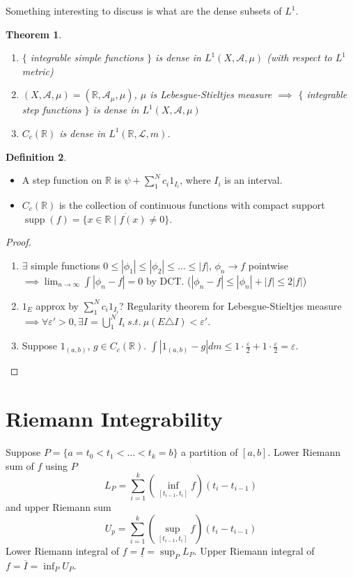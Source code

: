 \documentclass{report}
\newcommand{\R}{\mathbb{R}}
\newcommand{\st}{\ s.t.\ }
\newcommand{\cA}{\mathcal{A}}
\def \supp {\operatorname{supp}}
\newtheorem{theorem}{Theorem}[chapter]
\theoremstyle{definition}
\newtheorem{definition}[theorem]{Definition}
\theoremstyle{remark}
\newcommand{\fnl}{\parbox[t]{0\linewidth}{}}
\begin{document}
Something interesting to discuss is what are the dense subsets of $L^1$.
\begin{theorem}\fnl
	\begin{enumerate}
		\item $\{$ integrable simple functions $\}$ is dense in $L^1(X, \cA, \mu)$ (with respect to $L^1$ metric)
		\item $(X, \cA, \mu) = (\R, \cA_\mu, \mu)$, $\mu$ is Lebesgue-Stieltjes measure $\implies$ $\{$ integrable step functions $\}$ is dense in $L^1(X, \cA, \mu)$ 
		\item $C_c(\R)$ is dense in $L^1(\R, \mathcal{L}, m)$.
	\end{enumerate}
\end{theorem}
\begin{definition}\fnl
	\begin{itemize}
		\item A step function on $\R$ is $\psi + \sum_1^N c_i 1_{I_i}$, where $I_i$ is an interval.
		\item $C_c(\R)$ is the collection of continuous functions with compact support $\supp(f) = \overline{\{x \in \R \mid f(x) \neq 0\}}$.
	\end{itemize}
\end{definition}
\begin{proof}
	\begin{enumerate}
		\item $\exists$ simple functions $0 \leq |\phi_1| \leq |\phi_2| \leq \ldots \leq |f|$, $\phi_n \to f$ pointwise $\implies \displaystyle \lim_{n \to \infty} \int |\phi_n - f| = 0$ by DCT. ($|\phi_n - f| \leq |\phi_n| + |f| \leq 2|f|$)
		\item $1_E$ approx by $\sum_1^N c_i1_{I_i}$? Regularity theorem for Lebesgue-Stieltjes measure $\implies \forall \varepsilon' > 0, \exists I = \bigcup_1^N I_i \st \mu(E \triangle I) < \varepsilon'$.
		\item Suppose $1_{(a, b)}$, $g \in C_c(\R)$. $\int |1_{(a, b)} - g|dm \leq 1 \cdot \frac{\varepsilon}{2} + 1 \cdot \frac{\varepsilon}{2} = \varepsilon$. \qedhere
	\end{enumerate}
\end{proof}

\section{Riemann Integrability} 
Suppose $P = \{a = t_0 < t_1 < \ldots < t_k = b\}$ a partition of $[a, b]$. Lower Riemann sum of $f$ using $P$
\[L_P = \sum_{i = 1}^k \left(\inf_{[t_{i-1}, t_i]} f\right)(t_i - t_{i - 1})\] and upper Riemann sum
\[U_p = \sum_{i = 1}^k \left(\sup_{[t_{i-1}, t_i]} f\right)(t_i - t_{i - 1})\]
Lower Riemann integral of $f = \underline{I} = \sup_P L_P$. Upper Riemann integral of $f = \overline{I} = \inf_P U_P$.
\end{document}
